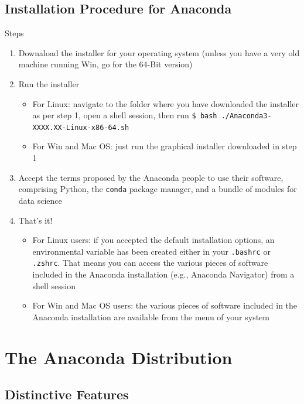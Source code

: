\documentclass[aspectratio=1610]{beamer}
\begin{document}
\subsection{Installation Procedure for Anaconda}

\begin{frame}[c]{Steps}
	\begin{enumerate}
		\item Downaload the installer for your operating system (unless you have a very old machine running Win, go for the 64-Bit version)
		\item Run the installer
		\begin{itemize}
			\item For Linux: navigate to the folder where you have downloaded the installer as per step 1, open a shell session, then run \texttt{\$ bash ./Anaconda3-XXXX.XX-Linux-x86-64.sh}
			\item For Win and Mac OS: just run the graphical installer downloaded in step 1
		\end{itemize}
		\item Accept the terms proposed by the Anaconda people to use their software, comprising Python, the \texttt{conda} package manager, and a bundle of modules for data science
		\item That's it!
		\begin{itemize}
		\item For Linux users: if you accepted the default installation options, an environmental variable has been created either in your \texttt{.bashrc} or \texttt{.zshrc}. That means you can access the various pieces of software included in the Anaconda installation (e.g., Anaconda Navigator) from a shell session
		\item For Win and Mac OS users: the various pieces of software included in the Anaconda installation are available from the menu of your system
		\end{itemize}
	\end{enumerate}
\end{frame}

\section{The Anaconda Distribution}

\subsection{Distinctive Features}
\end{document}
